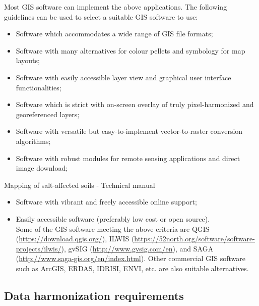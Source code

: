 \documentclass[
  10pt,
  b5paper,
]{book}
\providecommand{\tightlist}{%
  \setlength{\itemsep}{0pt}\setlength{\parskip}{0pt}}
\begin{document}
Most GIS software can implement the above applications. The following guidelines can be used to select a suitable GIS software to use:

\begin{itemize}
\tightlist
\item
  Software which accommodates a wide range of GIS file formats;\\
\item
  Software with many alternatives for colour pellets and symbology for map layouts;\\
\item
  Software with easily accessible layer view and graphical user interface functionalities;\\
\item
  Software which is strict with on-screen overlay of truly pixel-harmonized and georeferenced layers;\\
\item
  Software with versatile but easy-to-implement vector-to-raster conversion algorithms;\\
\item
  Software with robust modules for remote sensing applications and direct image download;
\end{itemize}

Mapping of salt-affected soils - Technical manual

\begin{itemize}
\tightlist
\item
  Software with vibrant and freely accessible online support;\\
\item
  Easily accessible software (preferably low cost or open source).\\
  Some of the GIS software meeting the above criteria are QGIS (\url{https://download.qgis.org/}), ILWIS (\url{https://52north.org/software/software-projects/ilwis/}), gvSIG (\url{http://www.gvsig.com/en}), and SAGA (\url{http://www.saga-gis.org/en/index.html}). Other commercial GIS software such as ArcGIS, ERDAS, IDRISI, ENVI, etc. are also suitable alternatives.
\end{itemize}

\hypertarget{data-harmonization-requirements}{%
\subsection{Data harmonization requirements}\label{data-harmonization-requirements}}
\end{document}
